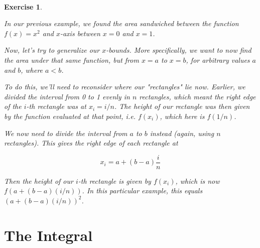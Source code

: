 \documentclass{article}
\newtheorem{exercise}{\\ \bf Exercise}
\begin{document}
\begin{exercise}
\label{riemann-general-bounds}

In our previous example, we found the area sandwiched between the function $f(x) = x^2$ and $x$-axis between $x = 0$ and $x = 1$.

Now, let's try to generalize our $x$-bounds. More specifically, we want to now find the area under that same function, but from $x = a$ to $x = b$, for arbitrary values $a$ and $b$, where $a < b$. 


To do this, we'll need to reconsider where our "rectangles" lie now. Earlier, we divided the interval from 0 to 1 evenly in $n$ rectangles, which meant the right edge of the $i$-th rectangle was at $x_i = i/n$. The height of our rectangle was then given by the function evaluated at that point, i.e. $f(x_i)$, which here is $f(1/n)$.

We now need to divide the interval from $a$ to $b$ instead (again, using $n$ rectangles). This gives the right edge of each rectangle at

\begin{equation}
x_i = a + (b-a)\frac{i}{n}
\end{equation}

Then the height of our $i$-th rectangle is given by $f(x_i)$, which is now $f(a + (b-a)(i/n))$. In this particular example, this equals $(a + (b-a)(i/n))^2$.

\end{exercise}











\section{The Integral}
\end{document}
